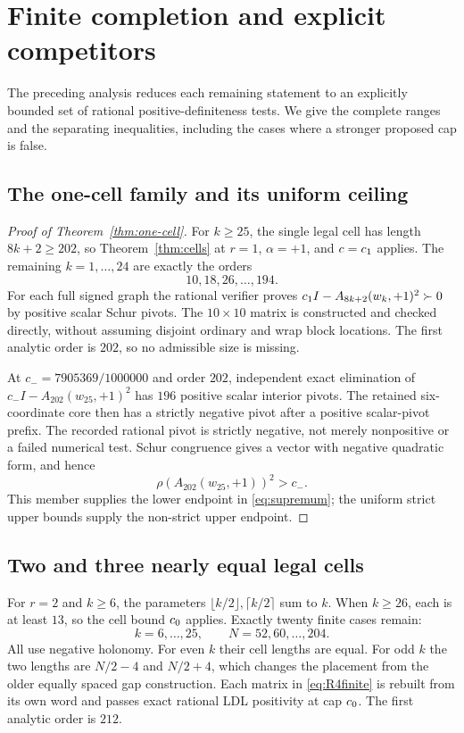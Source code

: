 \section{Finite completion and explicit competitors}
\label{sec:finite}

The preceding analysis reduces each remaining statement to an explicitly
bounded set of rational positive-definiteness tests. We give the complete
ranges and the separating inequalities, including the cases where a
stronger proposed cap is false.

\subsection{The one-cell family and its uniform ceiling}

\begin{proof}[Proof of Theorem~\ref{thm:one-cell}]
For $k\ge25$, the single legal cell has length $8k+2\ge202$, so
Theorem~\ref{thm:cells} at $r=1$, $\alpha=+1$, and $c=c_1$ applies.
The remaining $k=1,\ldots,24$ are exactly the orders
\[
 10,18,26,\ldots,194.
\]
For each full signed graph the rational verifier proves
$c_1 I-A_{8k+2}(w_k,+1)^2\succ0$ by positive scalar Schur pivots.
The $10\times10$ matrix is constructed and checked directly, without
assuming disjoint ordinary and wrap block locations. The first analytic
order is $202$, so no admissible size is missing.

At $c_-=7905369/1000000$ and order $202$, independent exact elimination
of $c_-I-A_{202}(w_{25},+1)^2$ has $196$ positive scalar interior pivots.
The retained six-coordinate core then has a strictly negative pivot after
a positive scalar-pivot prefix. The recorded rational pivot is strictly
negative, not merely nonpositive or a failed numerical test.
Schur congruence gives a vector with negative quadratic form, and hence
\[
 \rho(A_{202}(w_{25},+1))^2>c_-.
\]
This member supplies the lower endpoint in \eqref{eq:supremum}; the
uniform strict upper bounds supply the non-strict upper endpoint.
\end{proof}

\subsection{Two and three nearly equal legal cells}

For $r=2$ and $k\ge6$, the parameters
$\lfloor k/2\rfloor,\lceil k/2\rceil$ sum to $k$.
When $k\ge26$, each is at least $13$, so the cell bound $c_0$ applies.
Exactly twenty finite cases remain:
\begin{equation}
 k=6,\ldots,25,\qquad N=52,60,\ldots,204.
 \label{eq:R4finite}
\end{equation}
All use negative holonomy. For even $k$ their cell lengths are equal.
For odd $k$ the two lengths are $N/2-4$ and $N/2+4$, which changes the
placement from the older equally spaced gap construction. Each matrix in
\eqref{eq:R4finite} is rebuilt from its own word and passes exact rational
LDL positivity at cap $c_0$. The first analytic order is $212$.


